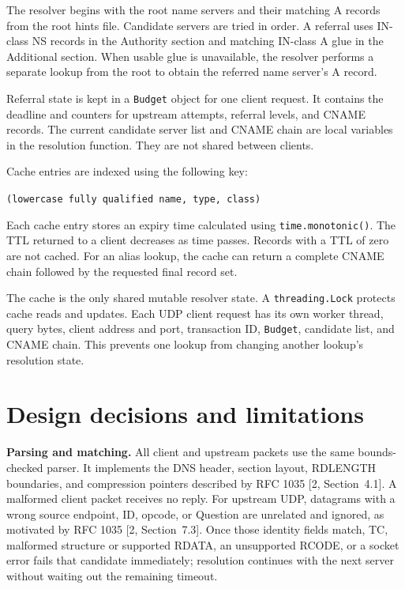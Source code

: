 \documentclass[11pt,a4paper]{article}
\newcommand{\code}[1]{\texttt{#1}}
\begin{document}
The resolver begins with the root name servers and their matching A records
from the root hints file. Candidate servers are tried in order. A referral uses
IN-class NS records in the Authority section and matching IN-class A glue in
the Additional section. When usable glue is unavailable, the resolver performs
a separate lookup from the root to obtain the referred name server's A record.

Referral state is kept in a \code{Budget} object for one client request. It
contains the deadline and counters for upstream attempts, referral levels, and
CNAME records. The current candidate server list and CNAME chain are local
variables in the resolution function. They are not shared between clients.

Cache entries are indexed using the following key:

\begin{center}
    \code{(lowercase fully qualified name, type, class)}
\end{center}

Each cache entry stores an expiry time calculated using
\code{time.monotonic()}. The TTL returned to a client decreases as time passes.
Records with a TTL of zero are not cached. For an alias lookup, the cache can
return a complete CNAME chain followed by the requested final record set.

The cache is the only shared mutable resolver state. A \code{threading.Lock}
protects cache reads and updates. Each UDP client request has its own worker
thread, query bytes, client address and port, transaction ID, \code{Budget},
candidate list, and CNAME chain. This prevents one lookup from changing another
lookup's resolution state.

\section{Design decisions and limitations}

\textbf{Parsing and matching.} All client and upstream packets use the same
bounds-checked parser. It implements the DNS header, section layout, RDLENGTH
boundaries, and compression pointers described by RFC 1035 [2, Section~4.1].
A malformed client packet receives no reply. For upstream UDP, datagrams with a
wrong source endpoint, ID, opcode, or Question are unrelated and ignored, as
motivated by RFC 1035 [2, Section~7.3]. Once those identity fields match, TC,
malformed structure or supported RDATA, an unsupported RCODE, or a socket error
fails that candidate immediately; resolution continues with the next server
without waiting out the remaining timeout.
\end{document}

